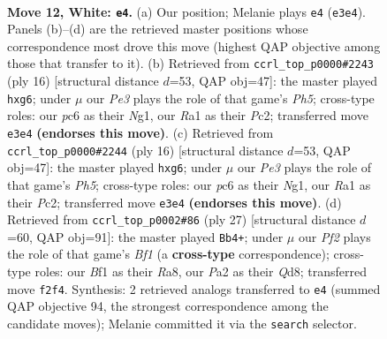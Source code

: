 \documentclass[11pt]{article}
\begin{document}
\clearpage

\begin{figure}[p]\centering
\begin{subfigure}{0.46\textwidth}\centering
\resizebox{\linewidth}{!}{%
\newchessgame
\chessboard[
  setfen={rnbqk2r/4bp2/2p5/pp1p1p1p/3P3P/2N1P3/PP3PP1/R2QKBNR w KQkq - 0 12},
  showmover=false,
  pgfstyle=straightmove, color=movearrow, markmove={e3-e4}
]}
\caption{}
\end{subfigure}\hfill
\begin{subfigure}{0.46\textwidth}\centering
\resizebox{\linewidth}{!}{%
\newchessgame
\chessboard[
  setfen={rn1qkb1r/ppp4p/4bpp1/3p3P/3Pp1P1/2N5/PPP2P2/R2QKBNR w KQkq - 1 9},
  showmover=false,
  pgfstyle=straightmove, color=movearrow, markmove={h5-g6}
]}
\caption{}
\end{subfigure}
\\[4pt]
\begin{subfigure}{0.46\textwidth}\centering
\resizebox{\linewidth}{!}{%
\newchessgame
\chessboard[
  setfen={rn1qkb1r/ppp4p/4bpp1/3p3P/3Pp1P1/2N5/PPP2P2/R2QKBNR w KQkq - 1 9},
  showmover=false,
  pgfstyle=straightmove, color=movearrow, markmove={h5-g6}
]}
\caption{}
\end{subfigure}\hfill
\begin{subfigure}{0.46\textwidth}\centering
\resizebox{\linewidth}{!}{%
\newchessgame
\chessboard[
  setfen={r2qkb1r/pp1n1pp1/2n1p2p/3pP2P/3P2P1/8/PP2NPB1/R1BQK2R b KQkq - 0 14},
  showmover=false,
  pgfstyle=straightmove, color=movearrow, markmove={f8-b4}
]}
\caption{}
\end{subfigure}
\caption{\textbf{Move 12, White: \texttt{e4}.} (a) Our position; Melanie plays \texttt{e4} (\texttt{e3e4}). Panels (b)--(d) are the retrieved master positions whose correspondence most drove this move (highest QAP objective among those that transfer to it). (b) Retrieved from \texttt{ccrl\_top\_p0000\#2243} (ply 16) [structural distance $d$=53, QAP obj=47]: the master played \texttt{hxg6}; under $\mu$ our \emph{Pe3} plays the role of that game's \emph{Ph5}; cross-type roles: our \emph{p}c6 as their \emph{N}g1, our \emph{R}a1 as their \emph{P}c2; transferred move \texttt{e3e4} \textbf{(endorses this move)}. (c) Retrieved from \texttt{ccrl\_top\_p0000\#2244} (ply 16) [structural distance $d$=53, QAP obj=47]: the master played \texttt{hxg6}; under $\mu$ our \emph{Pe3} plays the role of that game's \emph{Ph5}; cross-type roles: our \emph{p}c6 as their \emph{N}g1, our \emph{R}a1 as their \emph{P}c2; transferred move \texttt{e3e4} \textbf{(endorses this move)}. (d) Retrieved from \texttt{ccrl\_top\_p0002\#86} (ply 27) [structural distance $d$=60, QAP obj=91]: the master played \texttt{Bb4+}; under $\mu$ our \emph{Pf2} plays the role of that game's \emph{Bf1} (a \textbf{cross-type} correspondence); cross-type roles: our \emph{B}f1 as their \emph{R}a8, our \emph{P}a2 as their \emph{Q}d8; transferred move \texttt{f2f4}. Synthesis: 2 retrieved analogs transferred to \texttt{e4} (summed QAP objective 94, the strongest correspondence among the candidate moves); Melanie committed it via the \texttt{search} selector.}
\label{fig:thought-m22}
\end{figure}
\end{document}
